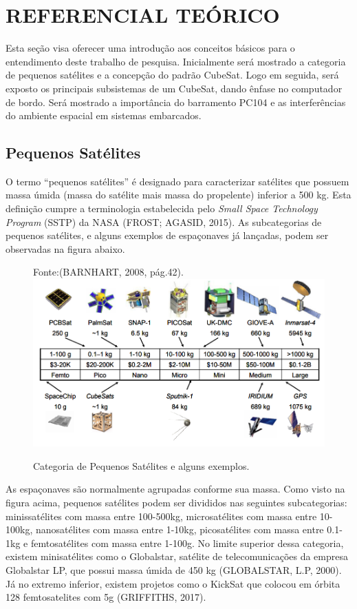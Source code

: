 \chapter[REFERENCIAL TEÓRICO]{REFERENCIAL TEÓRICO}

Esta seção visa oferecer uma introdução aos conceitos básicos para o entendimento deste trabalho de pesquisa. Inicialmente será mostrado a categoria de pequenos satélites e a concepção do padrão CubeSat. Logo em seguida, será exposto os principais subsistemas de um CubeSat, dando ênfase no computador de bordo. Será mostrado a importância do barramento PC104 e as interferências do ambiente espacial em sistemas embarcados.


\section{Pequenos Satélites}

O termo “pequenos satélites” é designado para caracterizar satélites que possuem massa úmida (massa do satélite mais massa do propelente) inferior a 500 kg. Esta definição cumpre a terminologia estabelecida pelo \textit{Small Space Technology Program} (SSTP) da NASA (FROST; AGASID, 2015). As subcategorias de pequenos satélites, e alguns exemplos de espaçonaves já lançadas, podem ser observadas na figura abaixo.


\begin{figure}[h]
	\centering
    
    Fonte:(BARNHART, 2008, pág.42).
	\includegraphics[keepaspectratio=true,scale=0.55]{figuras/categoria_satellite.PNG}
	\caption{Categoria de Pequenos Satélites e alguns exemplos.}
	\label{fig02}
\end{figure}

As espaçonaves são normalmente agrupadas conforme sua massa. Como visto na figura acima, pequenos satélites podem ser divididos nas seguintes subcategorias: minissatélites com massa entre 100-500kg, microsatélites com massa entre 10-100kg, nanosatélites com massa entre 1-10kg, picosatélites com massa entre 0.1-1kg e femtosatélites com massa entre 1-100g. No limite superior dessa categoria, existem minisatélites como o Globalstar, satélite de telecomunicações da empresa Globalstar LP, que possui massa úmida de 450 kg (GLOBALSTAR, L.P, 2000). Já no extremo inferior, existem projetos como o KickSat que colocou em órbita 128 femtosatelites  com 5g (GRIFFITHS, 2017).

